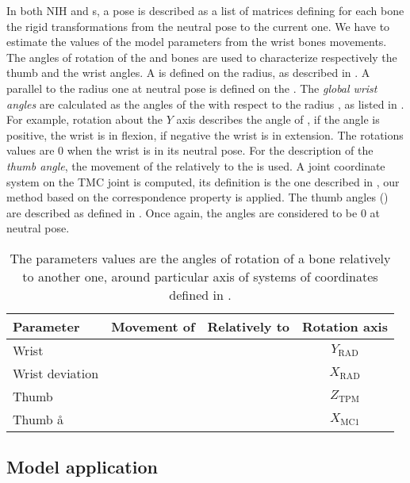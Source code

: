 In both NIH and \db*s, a pose is described as a list of matrices defining for each bone the rigid transformations from the neutral pose to the current one. We have to estimate the values of the model parameters from the wrist bones movements. The angles of rotation of the \mcu* and \mct* bones are used to characterize respectively the thumb and the wrist angles. A \soc* is defined on the radius, as described in . A \soc* parallel to the radius one at neutral pose is defined on the \mct*. The \textit{global wrist angles} are calculated as the angles of the \mct* with respect to the radius \cite{patterson_1998_high}, as listed in . For example, rotation about the $Y$ axis describes the angle of \fe*, if the angle is positive, the wrist is in flexion, if negative the wrist is in extension. The rotations values are $0$ when the wrist is in its neutral pose. For the description of the \textit{thumb angle}, the movement of the \mcu* relatively to the \tpm* is used. A joint coordinate system on the TMC joint is computed, its definition is the one described in , our method based on the correspondence property is applied. The thumb angles () are described as defined in \cite{halilaj_2013_thumb}. Once again, the angles are considered to be $0$ at neutral pose.

\begin{table}
	\centering
	\begin{tabular}{lccc}
		\toprule
		Parameter & Movement of & Relatively to & Rotation axis \\
		\midrule
		Wrist \fe* & \mct* & \rad* & $Y_\text{RAD}$ \\
		Wrist deviation & \mct* & \rad* & $X_\text{RAD}$ \\
		Thumb \fe* & \mcu* & \tpm* & $Z_\text{TPM}$ \\
		Thumb \aa* & \mcu* & \tpm* & $X_\text{MC1}$ \\
		\bottomrule
	\end{tabular}
	\caption[Computation of the statistical movement model parameters]{The parameters values are the angles of rotation of a bone relatively to another one, around particular axis of systems of coordinates defined in . }
	\label{tab:parameter_regression_computation}
\end{table}



\subsection{Model application}


